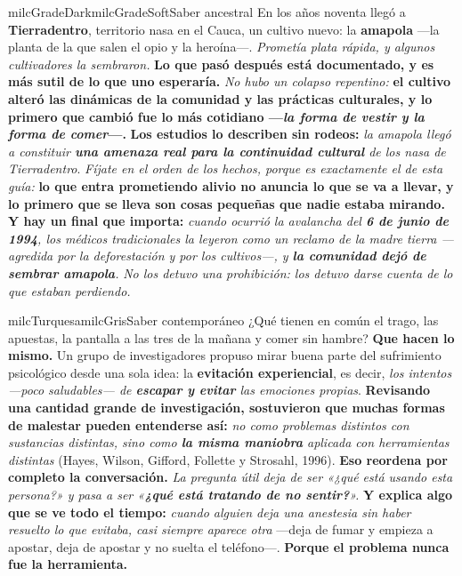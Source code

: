 \documentclass[11pt,letterpaper]{article}
\begin{document}
\begin{softbox}{milcGradeDark}{milcGradeSoft}{Saber ancestral}
En los años noventa llegó a \textbf{Tierradentro}, territorio nasa en el Cauca, un cultivo nuevo: la \textbf{amapola} ---la planta de la que salen el opio y la heroína---. \emph{Prometía plata rápida, y algunos cultivadores la sembraron.} \textbf{Lo que pasó después está documentado, y es más sutil de lo que uno esperaría.} \emph{No hubo un colapso repentino:} \textbf{el cultivo alteró las dinámicas de la comunidad y las prácticas culturales, y lo primero que cambió fue lo más cotidiano ---\emph{la forma de vestir y la forma de comer}---.} \textbf{Los estudios lo describen sin rodeos:} \emph{la amapola llegó a constituir \textbf{una amenaza real para la continuidad cultural} de los nasa de Tierradentro}. \emph{Fíjate en el orden de los hechos, porque es exactamente el de esta guía:} \textbf{lo que entra prometiendo alivio no anuncia lo que se va a llevar, y lo primero que se lleva son cosas pequeñas que nadie estaba mirando.} \textbf{Y hay un final que importa:} \emph{cuando ocurrió la avalancha del \textbf{6 de junio de 1994}, los médicos tradicionales la leyeron como un reclamo de la madre tierra ---agredida por la deforestación y por los cultivos---, y \textbf{la comunidad dejó de sembrar amapola}.} \emph{No los detuvo una prohibición: los detuvo darse cuenta de lo que estaban perdiendo.}
\end{softbox}

\begin{softbox}{milcTurquesa}{milcGris}{Saber contemporáneo}
¿Qué tienen en común el trago, las apuestas, la pantalla a las tres de la mañana y comer sin hambre? \textbf{Que hacen lo mismo.} Un grupo de investigadores propuso mirar buena parte del sufrimiento psicológico desde una sola idea: la \textbf{evitación experiencial}, es decir, \emph{los intentos ---poco saludables--- de \textbf{escapar y evitar} las emociones propias}. \textbf{Revisando una cantidad grande de investigación, sostuvieron que muchas formas de malestar pueden entenderse así:} \emph{no como problemas distintos con sustancias distintas, sino como \textbf{la misma maniobra} aplicada con herramientas distintas} (Hayes, Wilson, Gifford, Follette y Strosahl, 1996). \textbf{Eso reordena por completo la conversación.} \emph{La pregunta útil deja de ser «¿qué está usando esta persona?» y pasa a ser «\textbf{¿qué está tratando de no sentir?}».} \textbf{Y explica algo que se ve todo el tiempo:} \emph{cuando alguien deja una anestesia sin haber resuelto lo que evitaba, casi siempre aparece otra} ---deja de fumar y empieza a apostar, deja de apostar y no suelta el teléfono---. \textbf{Porque el problema nunca fue la herramienta.}
\end{softbox}
\end{document}
